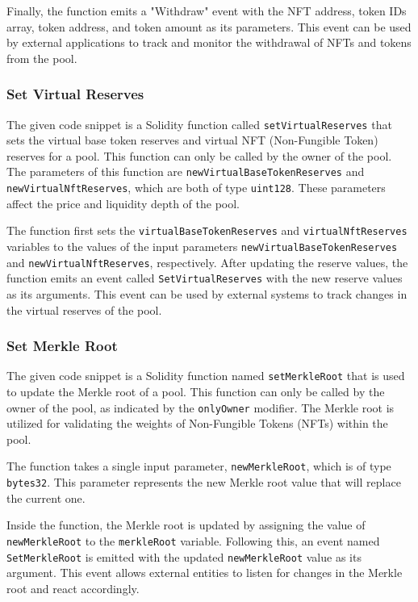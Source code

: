 Finally, the function emits a "Withdraw" event with the NFT address,
token IDs array, token address, and token amount as its parameters. This
event can be used by external applications to track and monitor the
withdrawal of NFTs and tokens from the pool.

\hypertarget{set-virtual-reserves}{%
\subsubsection{Set Virtual Reserves}\label{set-virtual-reserves}}

The given code snippet is a Solidity function called
\texttt{setVirtualReserves} that sets the virtual base token reserves
and virtual NFT (Non-Fungible Token) reserves for a pool. This function
can only be called by the owner of the pool. The parameters of this
function are \texttt{newVirtualBaseTokenReserves} and
\texttt{newVirtualNftReserves}, which are both of type \texttt{uint128}.
These parameters affect the price and liquidity depth of the pool.

The function first sets the \texttt{virtualBaseTokenReserves} and
\texttt{virtualNftReserves} variables to the values of the input
parameters \texttt{newVirtualBaseTokenReserves} and
\texttt{newVirtualNftReserves}, respectively. After updating the reserve
values, the function emits an event called \texttt{SetVirtualReserves}
with the new reserve values as its arguments. This event can be used by
external systems to track changes in the virtual reserves of the pool.

\hypertarget{set-merkle-root}{%
\subsubsection{Set Merkle Root}\label{set-merkle-root}}

The given code snippet is a Solidity function named
\texttt{setMerkleRoot} that is used to update the Merkle root of a pool.
This function can only be called by the owner of the pool, as indicated
by the \texttt{onlyOwner} modifier. The Merkle root is utilized for
validating the weights of Non-Fungible Tokens (NFTs) within the pool.

The function takes a single input parameter, \texttt{newMerkleRoot},
which is of type \texttt{bytes32}. This parameter represents the new
Merkle root value that will replace the current one.

Inside the function, the Merkle root is updated by assigning the value
of \texttt{newMerkleRoot} to the \texttt{merkleRoot} variable. Following
this, an event named \texttt{SetMerkleRoot} is emitted with the updated
\texttt{newMerkleRoot} value as its argument. This event allows external
entities to listen for changes in the Merkle root and react accordingly.

